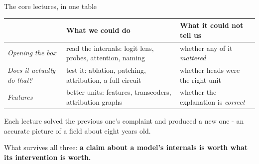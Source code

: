 \documentclass[aspectratio=169]{beamer}
\newcommand{\keybox}[1]{%
  \begin{tcolorbox}[colback=armblue!8, colframe=armblue, boxrule=0.6pt, arc=2pt]
  #1
  \end{tcolorbox}}
\newcommand{\takebox}[1]{%
  \begin{tcolorbox}[colback=paramgreen!8, colframe=paramgreen, boxrule=0.6pt, arc=2pt]
  #1
  \end{tcolorbox}}
\begin{document}
\begin{frame}{The core lectures, in one table}
  \vspace{0.4em}
  \begin{center}
  \small
  \begin{tabular}{@{}p{}p{}p{}@{}}
    \toprule
    & \textbf{What we could do} & \textbf{What it could not tell us}\\
    \midrule
    \emph{Opening the box} & read the internals: logit lens, probes, attention, naming & whether any of it
      \emph{mattered}\\[0.5em]
    \emph{Does it actually do that?} & test it: ablation, patching, attribution, a full circuit & whether heads were
      the right unit\\[0.5em]
    \emph{Features} & better units: features, transcoders, attribution graphs & whether the
      explanation is \emph{correct}\\
    \bottomrule
  \end{tabular}
  \end{center}

  \vspace{0.5em}
  \keybox{\small Each lecture solved the previous one's complaint and produced a new one - an
  accurate picture of a field about eight years old.}

  \vspace{0.35em}
  \takebox{\small What survives all three: \textbf{a claim about a model's internals is worth
  what its intervention is worth.}}
\end{frame}
\end{document}
